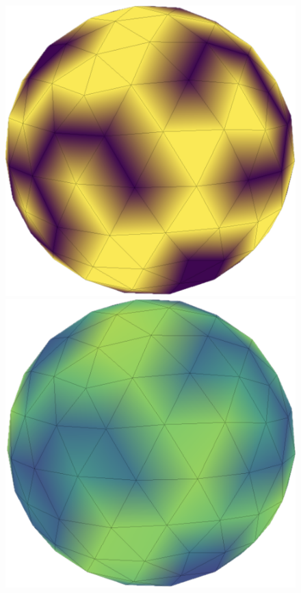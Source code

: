 \begin{figure}
    \centering
    \includegraphics[width=0.9\columnwidth]{../images/sphere_entropic.png}\vspace*{3mm}
    \includegraphics[width=0.9\columnwidth]{../images/sphere_smoothed.png}\vspace*{3mm}

\end{figure}
